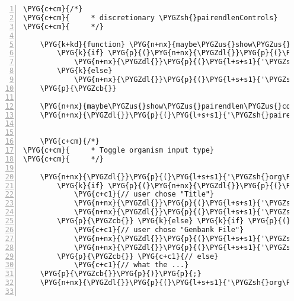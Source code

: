 \begin{Verbatim}[commandchars=\\\{\},numbers=left,firstnumber=1,stepnumber=5]
    \PYG{c+cm}{/*}
\PYG{c+cm}{     * discretionary \PYGZsh{}pairendlenControls}
\PYG{c+cm}{     */}

    \PYG{k+kd}{function} \PYG{n+nx}{maybe\PYGZus{}show\PYGZus{}pairendlen\PYGZus{}controls}\PYG{p}{(}\PYG{p}{)} \PYG{p}{\PYGZob{}}
        \PYG{k}{if} \PYG{p}{(}\PYG{n+nx}{\PYGZdl{}}\PYG{p}{(}\PYG{l+s+s1}{'\PYGZsh{}pairendedInput'}\PYG{p}{)}\PYG{p}{.}\PYG{n+nx}{attr}\PYG{p}{(}\PYG{l+s+s1}{'checked'}\PYG{p}{)}\PYG{p}{)}
            \PYG{n+nx}{\PYGZdl{}}\PYG{p}{(}\PYG{l+s+s1}{'\PYGZsh{}pairendlenControls'}\PYG{p}{)}\PYG{p}{.}\PYG{n+nx}{show}\PYG{p}{(}\PYG{p}{)}\PYG{p}{;}
        \PYG{k}{else}
            \PYG{n+nx}{\PYGZdl{}}\PYG{p}{(}\PYG{l+s+s1}{'\PYGZsh{}pairendlenControls'}\PYG{p}{)}\PYG{p}{.}\PYG{n+nx}{hide}\PYG{p}{(}\PYG{p}{)}\PYG{p}{;}
    \PYG{p}{\PYGZcb{}}

    \PYG{n+nx}{maybe\PYGZus{}show\PYGZus{}pairendlen\PYGZus{}controls}\PYG{p}{(}\PYG{p}{)}\PYG{p}{;}
    \PYG{n+nx}{\PYGZdl{}}\PYG{p}{(}\PYG{l+s+s1}{'\PYGZsh{}pairendedInput'}\PYG{p}{)}\PYG{p}{.}\PYG{n+nx}{change}\PYG{p}{(}\PYG{n+nx}{maybe\PYGZus{}show\PYGZus{}pairendlen\PYGZus{}controls}\PYG{p}{)}\PYG{p}{;}


    \PYG{c+cm}{/*}
\PYG{c+cm}{     * Toggle organism input type}
\PYG{c+cm}{     */}

    \PYG{n+nx}{\PYGZdl{}}\PYG{p}{(}\PYG{l+s+s1}{'\PYGZsh{}org\PYGZus{}type\PYGZus{}radio'}\PYG{p}{)}\PYG{p}{.}\PYG{n+nx}{click}\PYG{p}{(}\PYG{k+kd}{function}\PYG{p}{(}\PYG{n+nx}{event}\PYG{p}{)} \PYG{p}{\PYGZob{}}
        \PYG{k}{if} \PYG{p}{(}\PYG{n+nx}{\PYGZdl{}}\PYG{p}{(}\PYG{n+nx}{event}\PYG{p}{.}\PYG{n+nx}{target}\PYG{p}{)}\PYG{p}{.}\PYG{n+nx}{hasClass}\PYG{p}{(}\PYG{l+s+s2}{"title"}\PYG{p}{)}\PYG{p}{)} \PYG{p}{\PYGZob{}}
            \PYG{c+c1}{// user chose "Title"}
            \PYG{n+nx}{\PYGZdl{}}\PYG{p}{(}\PYG{l+s+s1}{'\PYGZsh{}genbankfile-controls'}\PYG{p}{)}\PYG{p}{.}\PYG{n+nx}{hide}\PYG{p}{(}\PYG{p}{)}\PYG{p}{;}
            \PYG{n+nx}{\PYGZdl{}}\PYG{p}{(}\PYG{l+s+s1}{'\PYGZsh{}org\PYGZus{}title-controls'}\PYG{p}{)}\PYG{p}{.}\PYG{n+nx}{show}\PYG{p}{(}\PYG{p}{)}\PYG{p}{;}
        \PYG{p}{\PYGZcb{}} \PYG{k}{else} \PYG{k}{if} \PYG{p}{(}\PYG{n+nx}{\PYGZdl{}}\PYG{p}{(}\PYG{n+nx}{event}\PYG{p}{.}\PYG{n+nx}{target}\PYG{p}{)}\PYG{p}{.}\PYG{n+nx}{hasClass}\PYG{p}{(}\PYG{l+s+s2}{"file"}\PYG{p}{)}\PYG{p}{)} \PYG{p}{\PYGZob{}}
            \PYG{c+c1}{// user chose "Genbank File"}
            \PYG{n+nx}{\PYGZdl{}}\PYG{p}{(}\PYG{l+s+s1}{'\PYGZsh{}org\PYGZus{}title-controls'}\PYG{p}{)}\PYG{p}{.}\PYG{n+nx}{hide}\PYG{p}{(}\PYG{p}{)}\PYG{p}{;}
            \PYG{n+nx}{\PYGZdl{}}\PYG{p}{(}\PYG{l+s+s1}{'\PYGZsh{}genbankfile-controls'}\PYG{p}{)}\PYG{p}{.}\PYG{n+nx}{show}\PYG{p}{(}\PYG{p}{)}\PYG{p}{;}
        \PYG{p}{\PYGZcb{}} \PYG{c+c1}{// else}
            \PYG{c+c1}{// what the ...}
    \PYG{p}{\PYGZcb{}}\PYG{p}{)}\PYG{p}{;}
    \PYG{n+nx}{\PYGZdl{}}\PYG{p}{(}\PYG{l+s+s1}{'\PYGZsh{}org\PYGZus{}type\PYGZus{}radio .title'}\PYG{p}{)}\PYG{p}{.}\PYG{n+nx}{click}\PYG{p}{(}\PYG{p}{)}\PYG{p}{;}


\end{Verbatim}
